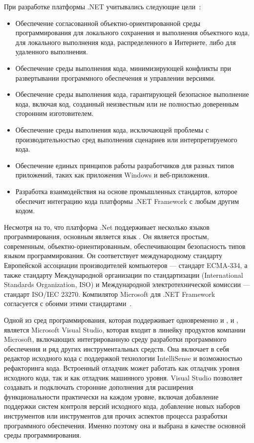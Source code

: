 При разработке платформы .NET учитывались следующие цели~\cite{msdn_dotnet}:

\begin{itemize}
	\item Обеспечение согласованной объектно-ориентированной среды про\-г\-ра\-мми\-ро\-ва\-ния для локального сохранения и выполнения объектного кода, для локального выполнения кода, распределенного в Интернете, либо для удаленного выполнения.
	\item Обеспечение среды выполнения кода, минимизирующей конфликты при развертывании программного обеспечения и управлении версиями.
	\item Обеспечение среды выполнения кода, гарантирующей безопасное выполнение кода, включая код, созданный неизвестным или не полностью доверенным сторонним изготовителем.
	\item Обеспечение среды выполнения кода, исключающей проблемы с производительностью сред выполнения сценариев или интерпретируемого кода.
	\item Обеспечение единых принципов работы разработчиков для разных типов приложений, таких как приложения Windows и веб-приложения.
	\item Разработка взаимодействия на основе промышленных стандартов, которое обеспечит интеграцию кода платформы .NET Framework с любым другим кодом.
\end{itemize}

Несмотря на то, что платформа .Net поддерживает несколько языков программирования, основным является язык \csharp. Он является простым, современным, объектно-ориентированным, обеспечивающим безопасность типов языком программирования. Он соответствует международному стандарту Европейской ассоциации производителей компьютеров — стандарт ECMA-334, а также стандарту Международной организации по стандартизации (In\-ter\-na\-ti\-o\-nal Standards Organization, ISO) и Международной электротехнической комиссии — стандарт ISO/IEC 23270. Компилятор Microsoft \csharp для .NET Framework согласуется с обоими этими стандартами~\cite{msdn_charp}.

Одной из сред программирования, которая поддерживает одновременно и \csharp, и \typescript, является Microsoft Visual Studio, которая входит в линейку продуктов компании Microsoft, включающих интегрированную среду разработки программного обеспечения и ряд других инструментальных средств. Она включает в себя редактор исходного кода с поддержкой технологии In\-tel\-li\-Sen\-se и возможностью рефакторинга кода. Встроенный отладчик может работать как отладчик уровня исходного кода, так и как отладчик машинного уровня. Visual Studio позволяет создавать и подключать сторонние дополнения для расширения функциональности практически на каждом уровне, включая добавление поддержки систем контроля версий исходного кода, добавление новых наборов инструментов или инструментов для прочих аспектов процесса разработки программного обеспечения. Именно поэтому она и выбрана в качестве основной среды программирования.

